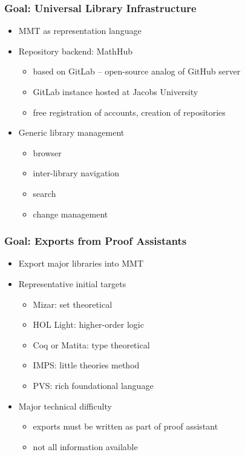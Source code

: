 \documentclass{beamer}
\begin{document}
\begin{frame}\frametitle{Goal: Universal Library Infrastructure}
\begin{itemize}
\item MMT as representation language
\item Repository backend: MathHub
 \begin{itemize}
  \item based on GitLab -- open-source analog of GitHub server
  \item GitLab instance hosted at Jacobs University
  \item free registration of accounts, creation of repositories
 \end{itemize}
\item Generic library management
 \begin{itemize}
  \item browser
  \item inter-library navigation
  \item search
  \item change management
\end{itemize}
\end{itemize}
\end{frame}

\begin{frame}\frametitle{Goal: Exports from Proof Assistants}
\begin{itemize}
\item Export major libraries into MMT
\item Representative initial targets
 \begin{itemize}
  \item Mizar: set theoretical
  \item HOL Light: higher-order logic
  \item Coq or Matita: type theoretical
  \item IMPS: little theories method
  \item PVS: rich foundational language
\end{itemize}
\item Major technical difficulty
  \begin{itemize}
    \item exports must be written as part of proof assistant
    \item not all information available
  \end{itemize}
\end{itemize}
\end{frame}
\end{document}

